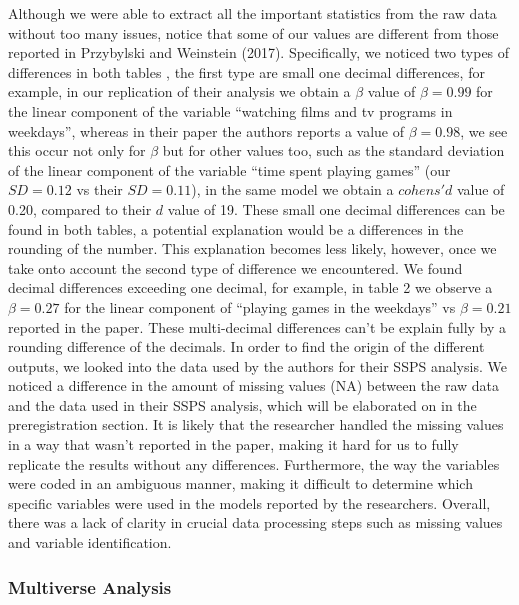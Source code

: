 \documentclass[man]{apa6}
\theoremstyle{definition}
\theoremstyle{definition}
\theoremstyle{definition}
\theoremstyle{remark}
\begin{document}
Although we were able to extract all the important statistics from the
raw data without too many issues, notice that some of our values are
different from those reported in Przybylski and Weinstein (2017).
Specifically, we noticed two types of differences in both tables , the
first type are small one decimal differences, for example, in our
replication of their analysis we obtain a \(\beta\) value of
\(\beta =0.99\) for the linear component of the variable
\enquote{watching films and tv programs in weekdays}, whereas in their
paper the authors reports a value of \(\beta=0.98\), we see this occur
not only for \(\beta\) but for other values too, such as the standard
deviation of the linear component of the variable \enquote{time spent
playing games} (our \(SD =0.12\) vs their \(SD =0.11\)), in the same
model we obtain a \(cohens'd\) value of 0.20, compared to their \(d\)
value of 19. These small one decimal differences can be found in both
tables, a potential explanation would be a differences in the rounding
of the number. This explanation becomes less likely, however, once we
take onto account the second type of difference we encountered. We found
decimal differences exceeding one decimal, for example, in table 2 we
observe a \(\beta =0.27\) for the linear component of \enquote{playing
games in the weekdays} vs \(\beta =0.21\) reported in the paper. These
multi-decimal differences can't be explain fully by a rounding
difference of the decimals. In order to find the origin of the different
outputs, we looked into the data used by the authors for their SSPS
analysis. We noticed a difference in the amount of missing values (NA)
between the raw data and the data used in their SSPS analysis, which
will be elaborated on in the preregistration section. It is likely that
the researcher handled the missing values in a way that wasn't reported
in the paper, making it hard for us to fully replicate the results
without any differences. Furthermore, the way the variables were coded
in an ambiguous manner, making it difficult to determine which specific
variables were used in the models reported by the researchers. Overall,
there was a lack of clarity in crucial data processing steps such as
missing values and variable identification.

\hypertarget{multiverse-analysis}{%
\subsubsection{Multiverse Analysis}\label{multiverse-analysis}}
\end{document}

